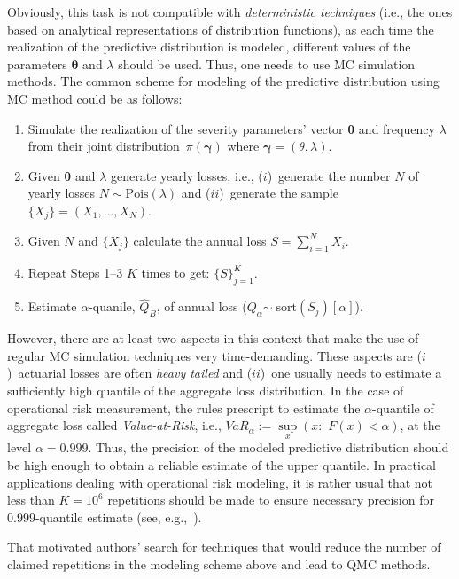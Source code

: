 \begin{multicols}{2}
Obviously, this task is not compatible with {\it deterministic
techniques} (i.e., the ones based on analytical representations of
distribution functions), as each time the realization of the
predictive distribution is modeled, different values of the
parameters $\boldsymbol\theta$ and $\lambda$ should be used. Thus,
one needs to use MC simulation methods. The common
scheme for modeling of the predictive distribution using MC method
could be as follows:
\begin{enumerate}[1.]
\item
Simulate the realization of the severity parameters' vector
$\boldsymbol\theta$ and frequency $\lambda$ from their joint
distribution~$\pi(\boldsymbol\gamma)$ where
$\boldsymbol\gamma=(\theta,\lambda)$.
\item Given $\boldsymbol\theta$ and $\lambda$ generate yearly losses, i.e.,
($i$)~generate the number $N$ of yearly losses
$N\sim\mbox{Pois}(\lambda)$ and ($ii$)~generate the sample
$\{X_j\}=(X_1,\dots,X_N)$.
\item Given $N$ and $\{X_j\}$ calculate the annual loss $S=\sum\limits_{i=1}^N X_i$.
\item Repeat Steps 1--3 $K$ times to get: $\{S\}_{j=1}^K$.
\item Estimate $\alpha$-quanile, $\widehat{Q}_B$, of annual loss
($Q_{\alpha}$\linebreak $\sim\; \mbox{sort}(S_j)[\alpha]$).
\end{enumerate}
However, there are at least two aspects in this context that make
the use of regular MC simulation techniques very
time-demanding. These aspects are ($i$)~actuarial losses are
often {\it heavy tailed} and ($ii$)~one usually needs to estimate a
sufficiently high quantile of the aggregate loss distribution. In
the case of operational risk measurement, the rules prescript to
estimate the $\alpha$-quantile of aggregate loss called {\it
Value-at-Risk}, i.e.,
$VaR_{\alpha}:=\sup\limits_x(x:\,\,F(x)<\alpha)$, at the level
$\alpha=0.999$. Thus, the precision of the modeled predictive
distribution should be high enough to obtain a reliable estimate of
the upper quantile. In practical applications dealing with
operational risk modeling, it is rather usual that not less than
$K=10^6$ repetitions should be made to ensure necessary precision
for $0.999$-quantile estimate (see, e.g.,~\cite{Shev4, TW}).


That motivated authors' search for techniques that would reduce the
number of claimed repetitions in the modeling scheme above and lead
to QMC methods.



\end{multicols}
